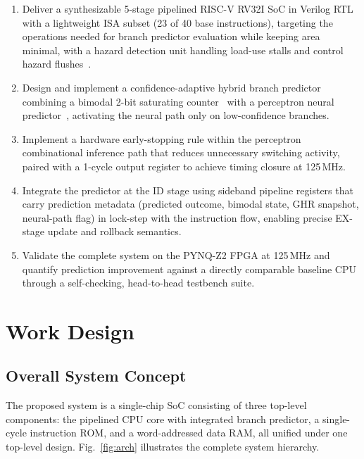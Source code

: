 \documentclass[12pt,a4paper]{article}
\begin{document}
\begin{enumerate}
  \item Deliver a synthesizable 5-stage pipelined RISC-V RV32I SoC in
    Verilog RTL with a lightweight ISA subset (23 of 40 base instructions),
    targeting the operations needed for branch predictor evaluation while
    keeping area minimal, with a hazard detection unit handling load-use stalls
    and control hazard flushes~\cite{waterman2016riscv,palnitkar2003verilog}.

  \item Design and implement a confidence-adaptive hybrid branch predictor
    combining a bimodal 2-bit saturating counter~\cite{smith1981study} with
    a perceptron neural predictor~\cite{jimenez2001perceptron}, activating the
    neural path only on low-confidence branches.

  \item Implement a hardware early-stopping rule within the perceptron combinational
    inference path that reduces unnecessary switching activity, paired with a
    1-cycle output register to achieve timing closure at 125\,MHz.

  \item Integrate the predictor at the ID stage using sideband pipeline registers
    that carry prediction metadata (predicted outcome, bimodal state, GHR snapshot,
    neural-path flag) in lock-step with the instruction flow, enabling precise
    EX-stage update and rollback semantics.

  \item Validate the complete system on the PYNQ-Z2 FPGA at 125\,MHz and
    quantify prediction improvement against a directly comparable baseline CPU
    through a self-checking, head-to-head testbench suite.
\end{enumerate}

\section{Work Design}
\label{sec:design}

\subsection{Overall System Concept}
\label{sec:system-concept}

The proposed system is a single-chip SoC consisting of three top-level components:
the pipelined CPU core with integrated branch predictor, a single-cycle instruction
ROM, and a word-addressed data RAM, all unified under one top-level design.
Fig.~\ref{fig:arch} illustrates the complete system hierarchy.
\end{document}
